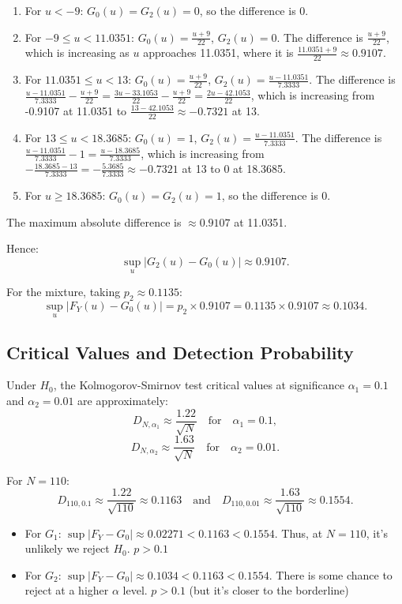 \documentclass{article}
\begin{document}
\begin{enumerate}
    \item For \(u < -9\): \(G_0(u) = G_2(u) = 0\), so the difference is 0.
    \item For \(-9 \le u < 11.0351\): \(G_0(u) = \frac{u+9}{22}\), \(G_2(u) = 0\). The difference is \(\frac{u+9}{22}\), which is increasing as \(u\) approaches 11.0351, where it is \(\frac{11.0351 + 9}{22} \approx 0.9107\).
    \item For \(11.0351 \le u < 13\): \(G_0(u) = \frac{u+9}{22}\), \(G_2(u) = \frac{u-11.0351}{7.3333}\). The difference is \(\frac{u-11.0351}{7.3333} - \frac{u+9}{22} = \frac{3u-33.1053}{22} - \frac{u+9}{22} = \frac{2u-42.1053}{22}\), which is increasing from -0.9107 at 11.0351 to \(\frac{13-42.1053}{22} \approx -0.7321\) at 13.
    \item For \(13 \le u < 18.3685\): \(G_0(u) = 1\), \(G_2(u) = \frac{u-11.0351}{7.3333}\). The difference is \(\frac{u-11.0351}{7.3333} - 1 = \frac{u-18.3685}{7.3333}\), which is increasing from \(-\frac{18.3685 - 13}{7.3333} = -\frac{5.3685}{7.3333} \approx -0.7321\) at 13 to 0 at 18.3685.
    \item For \(u \ge 18.3685\): \(G_0(u) = G_2(u) = 1\), so the difference is 0.
\end{enumerate}

The maximum absolute difference is \(\approx 0.9107\) at 11.0351.

Hence:
\[
\sup_u|G_2(u)-G_0(u)| \approx 0.9107.
\]

For the mixture, taking \(p_2 \approx 0.1135\):
\[
\sup_u|F_Y(u)-G_0(u)| = p_2 \times 0.9107 = 0.1135 \times 0.9107 \approx 0.1034.
\]

\subsection{Critical Values and Detection Probability}

Under \(H_0\), the Kolmogorov-Smirnov test critical values at significance \(\alpha_1=0.1\) and \(\alpha_2=0.01\) are approximately:
\[
D_{N,\alpha_1} \approx \frac{1.22}{\sqrt{N}} \quad \text{for} \quad \alpha_1=0.1,
\]
\[
D_{N,\alpha_2} \approx \frac{1.63}{\sqrt{N}} \quad \text{for} \quad \alpha_2=0.01.
\]

For \(N=110\):
\[
D_{110,0.1} \approx \frac{1.22}{\sqrt{110}} \approx 0.1163 \quad \text{and} \quad D_{110,0.01} \approx \frac{1.63}{\sqrt{110}} \approx 0.1554.
\]

\begin{itemize}
    \item For \(G_1\): \(\sup|F_Y-G_0|\approx 0.02271 < 0.1163 < 0.1554\). Thus, at \(N=110\), it's unlikely we reject \(H_0\). \(p > 0.1\)
    \item For \(G_2\): \(\sup|F_Y-G_0|\approx 0.1034 < 0.1163 < 0.1554\). There is some chance to reject at a higher \(\alpha\) level. \(p > 0.1\) (but it's closer to the borderline)
\end{itemize}
\end{document}
